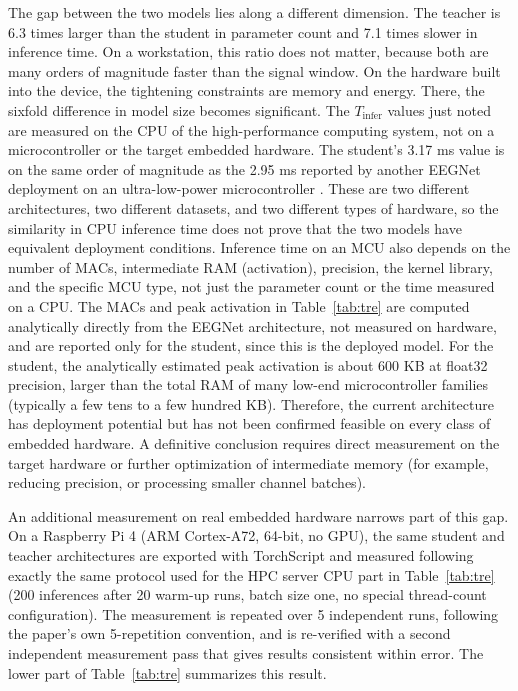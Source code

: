 The gap between the two models lies along a different dimension. The
teacher is 6.3 times larger than the student in parameter count and
7.1 times slower in inference time. On a workstation, this ratio
does not matter, because both are many orders of magnitude faster
than the signal window. On the hardware built into the device, the
tightening constraints are memory and energy. There, the sixfold
difference in model size becomes significant. The $T_{\mathrm{infer}}$
values just noted are measured on the CPU of the high-performance
computing system, not on a microcontroller or the target embedded
hardware. The student's 3.17 ms value is on the same order of
magnitude as the 2.95 ms reported by another EEGNet deployment on an
ultra-low-power microcontroller \cite{wang2024mibminet}. These are
two different architectures, two different datasets, and two
different types of hardware, so the similarity in CPU inference time
does not prove that the two models have equivalent deployment
conditions. Inference time on an MCU also depends on the number of
MACs, intermediate RAM (activation), precision, the kernel library,
and the specific MCU type, not just the parameter count or the time
measured on a CPU. The MACs and peak activation in
Table~\ref{tab:tre} are computed analytically directly from the
EEGNet architecture, not measured on hardware, and are reported only
for the student, since this is the deployed model. For the student,
the analytically estimated peak activation is about 600 KB at
float32 precision, larger than the total RAM of many low-end
microcontroller families (typically a few tens to a few hundred KB).
Therefore, the current architecture has deployment potential but has
not been confirmed feasible on every class of embedded hardware. A
definitive conclusion requires direct measurement on the target
hardware or further optimization of intermediate memory (for
example, reducing precision, or processing smaller channel batches).

An additional measurement on real embedded hardware narrows part of
this gap. On a Raspberry Pi 4 (ARM Cortex-A72, 64-bit, no GPU), the
same student and teacher architectures are exported with TorchScript
and measured following exactly the same protocol used for the HPC
server CPU part in Table~\ref{tab:tre} (200 inferences after 20
warm-up runs, batch size one, no special thread-count
configuration). The measurement is repeated over 5 independent runs,
following the paper's own 5-repetition convention, and is
re-verified with a second independent measurement pass that gives
results consistent within error. The lower part of Table~\ref{tab:tre}
summarizes this result.

